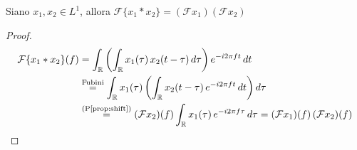         \begin{property}[Convoluzione]\label{prop:conv}
            Siano $x_1, x_2 \in L^1$, allora $\mathcal{F}\{x_1 * x_2\} = (\mathcal{F} x_1)(\mathcal{F} x_2)$
        \end{property}
        \begin{proof}
            \begin{align*}
                \mathcal{F}\{x_1 * x_2\}(f)
                &= \int_{\mathbb{R}} \qty( \int_{\mathbb{R}} x_1(\tau)\, x_2(t-\tau)\, d\tau ) e^{-i2\pi f t}\, dt \\
                &\overset{\text{Fubini}}{=} \int_{\mathbb{R}} x_1(\tau) \qty( \int_{\mathbb{R}} x_2(t-\tau)\, e^{-i2\pi f t}\, dt ) d\tau \\
                &\overset{\text{(P\ref{prop:shift})}}{=} (\mathcal{F}x_2)(f) \int_{\mathbb{R}} x_1(\tau)\, e^{-i2\pi f\tau}\, d\tau
                = (\mathcal{F}x_1)(f)\,(\mathcal{F}x_2)(f)
            \end{align*}
        \end{proof}

